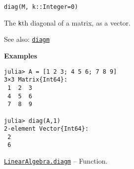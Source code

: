 \begin{adjustwidth}{2em}{0pt}


\begin{verbatim}
diag(M, k::Integer=0)
\end{verbatim}

The \texttt{k}th diagonal of a matrix, as a vector.

See also: \hyperlink{18133091318829836689}{\texttt{diagm}}

\textbf{Examples}


\begin{verbatim}
julia> A = [1 2 3; 4 5 6; 7 8 9]
3×3 Matrix{Int64}:
 1  2  3
 4  5  6
 7  8  9

julia> diag(A,1)
2-element Vector{Int64}:
 2
 6
\end{verbatim}



\end{adjustwidth}
\hypertarget{18133091318829836689}{}
\hyperlink{18133091318829836689}{\texttt{LinearAlgebra.diagm}}  -- {Function.}

